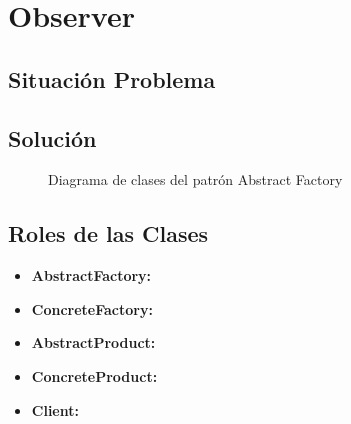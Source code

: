 
\chapter{Observer}

\patroninfo{}

\section{Situación Problema}



\section{Solución}


\begin{figure}[H]
    \centering
    \caption{Diagrama de clases del patrón Abstract Factory}
\end{figure}


\section{Roles de las Clases}


\begin{itemize}
    \item \textbf{AbstractFactory:}
    \item \textbf{ConcreteFactory:}
    \item \textbf{AbstractProduct:}
    \item \textbf{ConcreteProduct:}
    \item \textbf{Client:}
\end{itemize}



